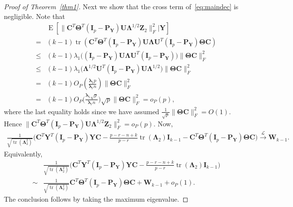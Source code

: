 \documentclass[12pt]{article} %
\DeclareMathOperator{\mytr}{tr}
\DeclareMathOperator{\myE}{E}
\newcommand{\bZ}{\mathbf{Z}}
\newcommand{\bP}{\mathbf{P}}
\newcommand{\bY}{\mathbf{Y}}
\newcommand{\bC}{\mathbf{C}}
\newcommand{\bI}{\mathbf{I}}
\newcommand{\bU}{\mathbf{U}}
\newcommand{\bW}{\mathbf{W}}
\newcommand{\bfsym}[1]{\ensuremath{\boldsymbol{#1}}}
\def\blambda {\bfsym {\lambda}}
\def\bLambda {\bfsym {\Lambda}}
\def\bTheta {\bfsym {\Theta}}
\theoremstyle{definition}
\begin{document}
\begin{appendices}
\begin{proof}[\textrm{Proof of Theorem~\ref{thm1}}]
Next we show that the cross term of~\eqref{eq:maindec} is negligible. Note that
$$
\begin{aligned}
    &\myE [\|\bC^T \bTheta^T (\bI_p -\bP_{\bY})\bU\bLambda^{1/2}\bZ_2\|_F^2|\bY]\\
    = &
    (k-1)\mytr(\bC^T \bTheta^T (\bI_p -\bP_{\bY})\bU\bLambda \bU^T (\bI_p -\bP_{\bY})\bTheta \bC)\\
    \leq &
    (k-1)\lambda_1\big((\bI_p -\bP_{\bY})\bU\bLambda \bU^T (\bI_p -\bP_{\bY})\big)\|\bTheta \bC\|^2_F\\
    \leq &
    (k-1)\lambda_1\big(\bLambda^{1/2} \bU^T (\bI_p -\bP_{\bY})\bU \bLambda^{1/2}\big)\|\bTheta \bC\|^2_F\\
    = &
    (k-1) O_P(\frac{\blambda_1 p}{\blambda_r n})  \|\bTheta \bC\|^2_F\\
    = &
    (k-1) O_P\big(\frac{\blambda_1 \sqrt{p}}{\blambda_r n}\big) \sqrt{p}  \|\bTheta \bC\|^2_F=o_P(p),
\end{aligned}
$$
where the last equality holds since we have assumed $\frac{1}{\sqrt{p}}\|\bTheta \bC\|_F^2=O(1)$.
Hence $\|\bC^T \bTheta^T (\bI_p -\bP_{\bY})\bU\bLambda^{1/2}\bZ_2\|_F^2=o_P(p)$. Now,
$$
\begin{aligned}
\frac{1}{\sqrt{\mytr(\bLambda_2^2)}}
    \big( \bC^T\bY^T(\bI_p-\bP_{\bY}) \bY \bC
    -\tfrac{p-r-n+k}{p-r}\mytr(\bLambda_2)\bI_{k-1} -\bC^T \bTheta^T (\bI_p-\bP_{\bY})\bTheta \bC\big)
\xrightarrow{\mathcal{L}} \bW_{k-1}.
\end{aligned}
$$
    Equivalently,
    $$
    \begin{aligned}
        &\frac{1}{\sqrt{\mytr(\bLambda_2^2)}} {\Big(\bC^T\bY^T(\bI_p-\bP_{\bY}) \bY \bC- \frac{p-r-n+k}{p-r}\mytr(\bLambda_2)\bI_{k-1}}\Big)\\
        \sim&
\frac{1}{\sqrt{\mytr(\bLambda_2^2)}} \bC^T \bTheta^T (\bI_p-\bP_{\bY})\bTheta \bC
        +\bW_{k-1}+o_P(1).
    \end{aligned}
    $$
    The conclusion follows by taking the maximum eigenvalue.
\end{proof}


\end{appendices}
\end{document}
